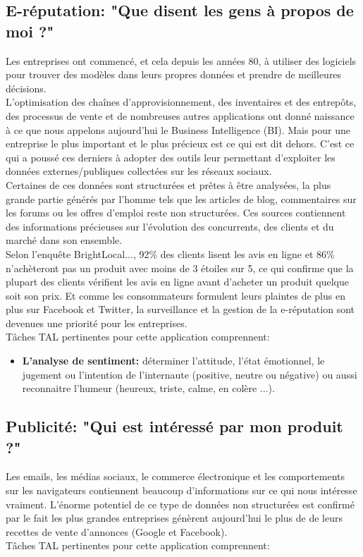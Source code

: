 \documentclass{report}
\begin{document}
    \subsection*{E-réputation: "Que disent les gens à propos de moi ?" }
    Les entreprises ont commencé, et cela depuis les années 80, à utiliser des logiciels pour trouver des modèles dans leurs propres données et prendre de meilleures décisions.\\ 
    L'optimisation des chaînes d'approvisionnement, des inventaires et des entrepôts, des processus de vente et de nombreuses autres applications ont donné naissance à ce que nous appelons aujourd'hui le Business Intelligence (BI). Mais pour une entreprise le plus important et le plus précieux est ce qui est dit dehors. C'est ce qui a poussé ces derniers à adopter des outils leur permettant d'exploiter les données externes/publiques collectées sur les réseaux sociaux.\\
    Certaines de ces données sont structurées et prêtes à être analysées, la plus grande partie générés par l'homme tels que les articles de blog, commentaires sur les forums ou les offres d'emploi reste non structurées. Ces sources contiennent des informations précieuses sur l'évolution des concurrents, des clients et du marché dans son ensemble.\\
    Selon l'enquête BrightLocal..., 92\% des clients lisent les avis en ligne et 86\% n'achèteront pas un produit avec moins de 3 étoiles sur 5, ce qui confirme que la plupart des clients vérifient les avis en ligne avant d'acheter un produit quelque soit son prix. 
    Et comme les consommateurs formulent leurs plaintes de plus en plus sur Facebook et Twitter, la surveillance et la gestion de la e-réputation sont devenues une priorité pour les entreprises.\\

    Tâches TAL pertinentes pour cette application comprennent:
    \begin{itemize}
        \item \textbf{L'analyse de sentiment:} déterminer l'attitude, l'état émotionnel, le jugement ou l'intention de l'internaute (positive, neutre ou négative) ou aussi reconnaitre l'humeur (heureux, triste, calme, en colère ...).\\
    \end{itemize}

    \subsection*{Publicité: "Qui est intéressé par mon produit ?"}
    Les emails, les médias sociaux, le commerce électronique et les comportements sur les navigateurs contiennent beaucoup d'informations sur ce qui nous intéresse vraiment. L'énorme potentiel de ce type de données non structurées est confirmé par le fait les plus grandes entreprises génèrent aujourd'hui le plus de de leurs recettes de vente d'annonces (Google et Facebook).\\ 
    Tâches TAL pertinentes pour cette application comprennent:
\end{document}
